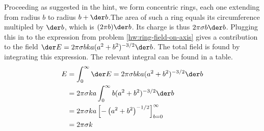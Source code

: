 Proceeding as suggested in the hint, we form concentric
rings, each one extending from radius $b$ to radius
$b+\der b$.The area of such a ring equals its circumference
multipled by $\der b$, which is $(2\pi b)\der b$. Its charge is thus
$2\pi\sigma b\der b$.  Plugging this in to the expression from problem \ref{hw:ring-field-on-axis}
gives a contribution to the field $\der E=2\pi\sigma bka(a^2+b^2)^{-3/2}\der b$.
The total field is found by integrating this expression. The
relevant integral can be found in a table.
\begin{align*}
		E	 &=  \int_0^\infty \der E=2\pi\sigma bka(a^2+b^2)^{-3/2}\der b    \\
			 &=  2\pi\sigma ka  \int_0^\infty b (a^2+b^2)^{-3/2} \der b  \\
			 &=  2\pi\sigma ka\left[-\left(a^2+b^2\right)^{-1/2}\right]_{b=0}^\infty    \\
			 &=  2\pi\sigma k
\end{align*}



